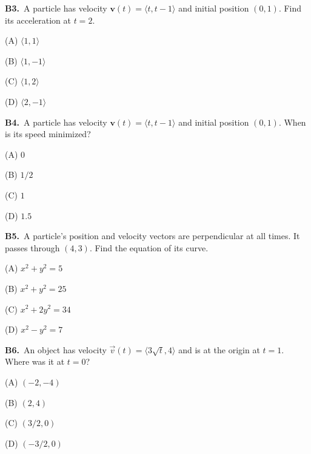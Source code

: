 \documentclass[11pt]{article}
\begin{document}
\bigskip\noindent\textbf{B3.}\ A particle has velocity $\mathbf v(t)=\langle t,t-1\rangle$ and initial position $(0,1)$. Find its acceleration at $t=2$.
\begin{list}{}{\setlength{\leftmargin}{3em}\setlength{\labelwidth}{2.5em}\setlength{\itemsep}{0pt}\setlength{\topsep}{2pt}}
\item[(A)] $\langle1,1\rangle$
\item[(B)] $\langle1,-1\rangle$
\item[(C)] $\langle1,2\rangle$
\item[(D)] $\langle2,-1\rangle$
\end{list}

\bigskip\noindent\textbf{B4.}\ A particle has velocity $\mathbf v(t)=\langle t,t-1\rangle$ and initial position $(0,1)$. When is its speed minimized?
\begin{list}{}{\setlength{\leftmargin}{3em}\setlength{\labelwidth}{2.5em}\setlength{\itemsep}{0pt}\setlength{\topsep}{2pt}}
\item[(A)] $0$
\item[(B)] $1/2$
\item[(C)] $1$
\item[(D)] $1.5$
\end{list}

\bigskip\noindent\textbf{B5.}\ A particle's position and velocity vectors are perpendicular at all times. It passes through $(4,3)$. Find the equation of its curve.
\begin{list}{}{\setlength{\leftmargin}{3em}\setlength{\labelwidth}{2.5em}\setlength{\itemsep}{0pt}\setlength{\topsep}{2pt}}
\item[(A)] $x^2+y^2=5$
\item[(B)] $x^2+y^2=25$
\item[(C)] $x^2+2y^2=34$
\item[(D)] $x^2-y^2=7$
\end{list}

\bigskip\noindent\textbf{B6.}\ An object has velocity $\vec v(t)=\langle3\sqrt t,4\rangle$ and is at the origin at $t=1$. Where was it at $t=0$?
\begin{list}{}{\setlength{\leftmargin}{3em}\setlength{\labelwidth}{2.5em}\setlength{\itemsep}{0pt}\setlength{\topsep}{2pt}}
\item[(A)] $(-2,-4)$
\item[(B)] $(2,4)$
\item[(C)] $(3/2,0)$
\item[(D)] $(-3/2,0)$
\end{list}
\end{document}
